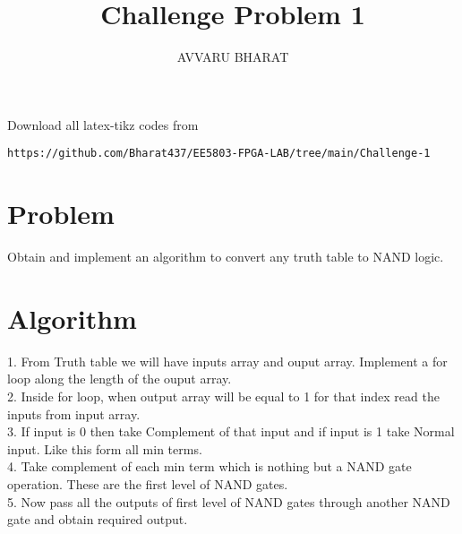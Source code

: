 \documentclass{article}
\begin{document}
     \def\rightbox#1{\makebox[0in][r]{#1}}
     \def\centbox#1{\makebox[0in]{#1}}
     \def\topbox#1{\raisebox{-\baselineskip}[0in][0in]{#1}}
     \def\midbox#1{\raisebox{-0.5\baselineskip}[0in][0in]{#1}}
\vspace{3cm}
\title{Challenge Problem 1}
\author{AVVARU BHARAT}
\date{}
\maketitle
\renewcommand\thefigure{\arabic{figure}}
\setcounter{figure}{0}
\renewcommand{\thetable}{\arabic{table}}
\setcounter{table}{0}
Download all latex-tikz codes from 
%
\begin{lstlisting}
https://github.com/Bharat437/EE5803-FPGA-LAB/tree/main/Challenge-1
\end{lstlisting}
%
\section{Problem}
Obtain and implement an algorithm to convert any truth table to NAND logic.
\section{Algorithm}
1. From Truth table we will have inputs array and ouput array. Implement a for loop along the length of the ouput array.\\
2. Inside for loop, when output array will be equal to 1 for that index read the inputs from input array.\\
3. If input is 0 then take Complement of that input and if input is 1 take Normal input. Like this form all min terms.\\
4. Take complement of each min term which is nothing but a NAND gate operation. These are the first level of NAND gates.\\
5. Now pass all the outputs of first level of NAND gates through another NAND gate and obtain required output.
\end{document}
